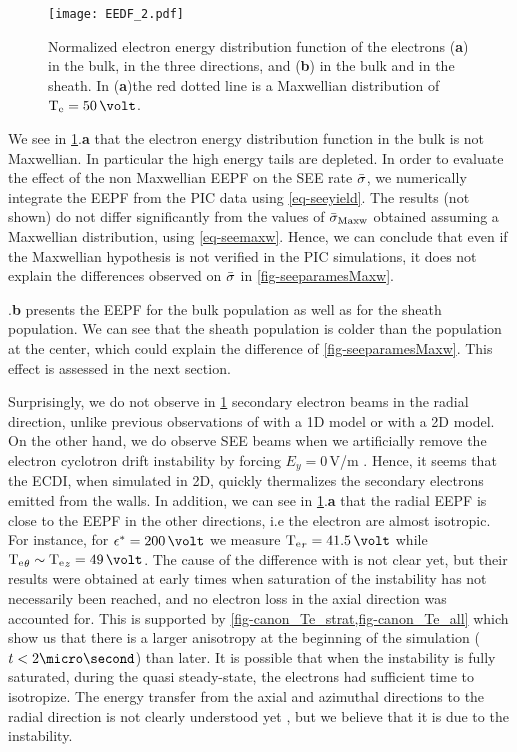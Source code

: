      \begin{figure}[hbt]
       \centering
       \texttt{[image: EEDF\_2.pdf]}
       \caption{Normalized electron energy distribution function of the electrons ({\bf a}) in the bulk, in the three directions, and ({\bf b}) in the bulk and in the sheath. In ({\bf a})the red dotted line is  a Maxwellian distribution of $\Te=50\,\volt$. }
       \label{fig-EEDF}
     \end{figure}
     
    We see in \cref{fig-EEDF}.{\bf a} that the electron energy distribution function in the bulk is not Maxwellian.
    In particular the high energy tails are depleted.
    In order to evaluate the effect of the non Maxwellian EEPF on the \ac{SEE} rate $ \bar{\sigma }$, we numerically integrate the EEPF from the PIC data using \cref{eq-seeyield}.
    The results (not shown) do not differ significantly from the values of $ \bar{\sigma }_{\rm Maxw}$ obtained assuming a Maxwellian distribution, using \cref{eq-seemaxw}.
    Hence, we can conclude that even if the Maxwellian hypothesis is not verified in the PIC simulations, it does not explain  the differences observed on $ \bar{\sigma }$ in \cref{fig-seeparamesMaxw}.


    .{\bf b} presents the EEPF for the bulk population as well as for the sheath population.
    We can see that the sheath population is colder than the population at the center, which could explain the difference of \cref{fig-seeparamesMaxw}. 
    This effect is assessed in the next section.

     Surprisingly, we do not observe in \cref{fig-EEDF} secondary electron beams in the radial  direction, unlike previous observations of \citet{sydorenko2006} with a 1D model or \citet{heron2013} with a 2D model.
     On the other hand, we do observe SEE beams when  we artificially remove the electron cyclotron drift instability by forcing $E_y = 0$\,V/m \citep{croes2017}.
     Hence, it seems that the ECDI, when simulated in 2D, quickly thermalizes the secondary electrons emitted from the walls.
     In addition, we can see in \cref{fig-EEDF}.{\bf a} that the radial EEPF is close to the EEPF in the other directions, i.e the electron are almost isotropic.
     For instance, for $\crover = 200\,\volt$  we measure $\Te_r = 41.5\,\volt$ while $\Te_{\theta} \sim \Te_z = 49\,\volt$.
     The cause of the difference with \citet{heron2013} is not clear yet, but their results were  obtained at early times when saturation of the instability has not necessarily been reached, and no electron loss in  the axial direction was accounted for.
     This is supported by \cref{fig-canon_Te_strat,fig-canon_Te_all} which show us that there is a larger anisotropy at the beginning of the simulation ($t<2\micro\second$) than later.
     It is possible that when the instability is fully saturated, during the quasi steady-state, the electrons had sufficient time to isotropize.
     The energy transfer from the axial and azimuthal directions to the radial direction is not clearly understood
     yet \citep{janhunen2018}, but we believe that it is due to the instability.



